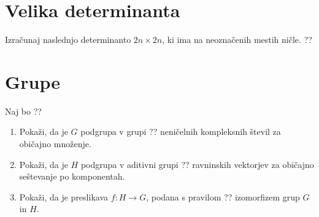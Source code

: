 \documentclass[a4paper,12pt]{article}
\begin{document}
\section*{Velika determinanta}

Izračunaj naslednjo determinanto \(2n \times 2n\), ki ima na neoznačenih mestih ničle.
??
%
%

\section*{Grupe}

Naj bo
??
\begin{enumerate}
\item
Pokaži, da je \(G\) podgrupa v grupi ??
neničelnih kompleksnih števil za običajno množenje.

\item
Pokaži, da je \(H\) podgrupa v aditivni grupi ??
ravninskih vektorjev za običajno seštevanje po komponentah.

\item
Pokaži, da je preslikava \(f:H\to G\), podana s pravilom
??
izomorfizem grup \(G\) in \(H\).
\end{enumerate}
\end{document}
